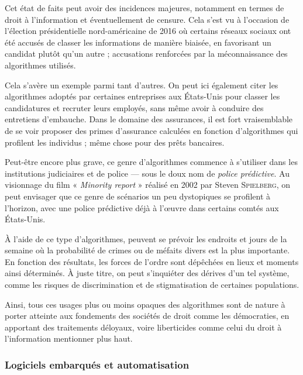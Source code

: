 Cet état de faits peut avoir des incidences majeures, notamment en termes de droit à l'information et éventuellement de censure.
Cela s'est vu à l'occasion de l'élection présidentielle nord-américaine de 2016 où certains réseaux sociaux ont été accusés de classer les informations de manière biaisée, en favorisant un candidat plutôt qu'un autre ; accusations renforcées par la méconnaissance des algorithmes utilisés.

Cela s'avère un exemple parmi tant d'autres. On peut ici également citer les algorithmes adoptés par certaines entreprises aux États-Unis pour classer les candidatures et recruter leurs employés, sans même avoir à conduire des entretiens d'embauche. Dans le domaine des assurances, il est fort vraisemblable de se voir proposer des primes d'assurance calculées en fonction d'algorithmes qui profilent les individus ; même chose pour des prêts bancaires.
 
Peut-être encore plus grave,  ce genre d'algorithmes commence à s'utiliser dans les institutions judiciaires et de police --- sous le doux nom de \emph{police prédictive}. Au visionnage du film « \textit{Minority report} » réalisé en 2002 par Steven \textsc{Spielberg}, on peut envisager que ce genre de scénarios un peu dystopiques se profilent à l'horizon, avec une police prédictive déjà à l'œuvre dans certains comtés aux États-Unis.

À l'aide de ce type d'algorithmes, peuvent se prévoir les endroits et jours de la semaine où la probabilité de crimes ou de méfaits divers est la plus importante. En fonction des résultats, les forces de l'ordre sont dépêchées en lieux et moments ainsi déterminés. À juste titre, on peut s'inquiéter des dérives d'un tel système, comme les risques de discrimination et de stigmatisation de certaines populations.

Ainsi, tous ces usages plus ou moins opaques des algorithmes sont de nature à porter atteinte aux fondements des sociétés de droit com\-me les démocraties, en apportant des traitements déloyaux, voire liberticides comme celui du droit à l'information mentionner plus haut.  

\subsubsection[Automatisation]{Logiciels embarqués et automatisation}
\label{subsub:I.4.1.3}

